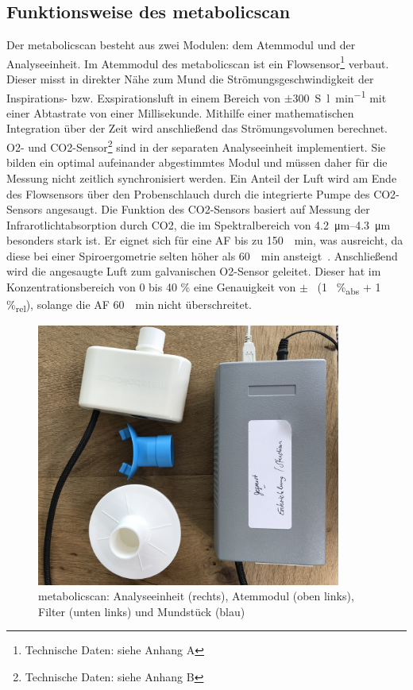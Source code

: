 \subsection{Funktionsweise des metabolicscan}
%
Der metabolicscan besteht aus zwei Modulen: dem Atemmodul und der Analyseeinheit. Im Atemmodul des metabolicscan ist ein Flowsensor\footnote{Technische Daten: siehe Anhang A} verbaut. Dieser misst in direkter Nähe zum Mund die Strömungsgeschwindigkeit der Inspirations- bzw. Exspirationsluft in einem Bereich von $\pm$\SI{300}{S\litre\per\minute} mit einer Abtastrate von einer Millisekunde. Mithilfe einer mathematischen Integration über der Zeit wird anschließend das Strömungsvolumen berechnet. \acs{O2}- und \acs{CO2}-Sensor\footnote{Technische Daten: siehe Anhang B} sind in der separaten Analyseeinheit implementiert. Sie bilden ein optimal aufeinander abgestimmtes Modul und müssen daher für die Messung nicht zeitlich synchronisiert werden. Ein Anteil der Luft wird am Ende des Flowsensors über den Probenschlauch durch die integrierte Pumpe des \acs{CO2}-Sensors angesaugt. Die Funktion des \acs{CO2}-Sensors basiert auf Messung der Infrarotlichtabsorption durch \acs{CO2}, die im Spektralbereich von \SIrange{4,2}{4,3}{\micro\metre} besonders stark ist. Er eignet sich für eine \ac{AF} bis zu \SI{150}{\per\minute}, was ausreicht, da diese bei einer Spiroergometrie selten höher als \SI{60}{\per\minute} ansteigt~\cite{Hollmann.2006}. Anschließend wird die angesaugte Luft zum galvanischen \acs{O2}-Sensor geleitet. Dieser hat im Konzentrationsbereich von 0 bis 40 \% eine Genauigkeit von $\pm$~ (1~ \%\textsubscript{abs} + 1 \%\textsubscript{rel}), solange die \acs{AF} \SI{60}{\per\minute} nicht überschreitet.
%
\begin{figure}[H]
	\centering
	\includegraphics[width=100mm]{Bilder/mbs.jpg}
	\caption[metabolicscan: Analyseeinheit, Atemmodul, Filter und Mundstück]{metabolicscan: Analyseeinheit (rechts), Atemmodul (oben links), Filter (unten links) und Mundstück (blau)}
	\label{pic:pic9}
\end{figure}
%
